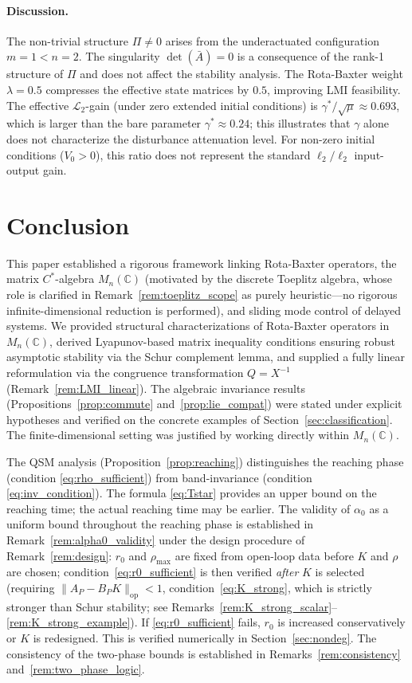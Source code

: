 \documentclass[10pt]{amsart}
\numberwithin{equation}{section}
\begin{document}
\paragraph{Discussion.}
The non-trivial structure $\Pi \neq 0$ arises from the underactuated configuration
$m=1<n=2$. The singularity $\det(\bar{A})=0$ is a consequence of the rank-1 structure
of $\Pi$ and does not affect the stability analysis. The Rota-Baxter weight
$\lambda=0.5$ compresses the effective state matrices by $0.5$, improving LMI
feasibility. The effective $\mathcal{L}_2$-gain (under zero extended initial conditions)
is $\gamma^*/\sqrt{\mu} \approx 0.693$, which is larger than the bare parameter
$\gamma^* \approx 0.24$; this illustrates that $\gamma$ alone does not characterize
the disturbance attenuation level. For non-zero initial conditions ($V_0 > 0$),
this ratio does not represent the standard $\ell_2/\ell_2$ input-output gain.


\section{Conclusion}\label{sec:conclusion}
This paper established a rigorous framework linking Rota-Baxter operators, the matrix
$C^*$-algebra $M_n(\mathbb{C})$ (motivated by the discrete Toeplitz algebra, whose
role is clarified in Remark~\ref{rem:toeplitz_scope} as purely heuristic---no rigorous
infinite-dimensional reduction is performed), and sliding mode control of delayed
systems. We provided structural characterizations of Rota-Baxter operators in
$M_n(\mathbb{C})$, derived Lyapunov-based matrix inequality conditions ensuring robust
asymptotic stability via the Schur complement lemma, and supplied a fully linear
reformulation via the congruence transformation $Q = X^{-1}$
(Remark~\ref{rem:LMI_linear}). The algebraic invariance results
(Propositions~\ref{prop:commute} and~\ref{prop:lie_compat}) were stated under explicit
hypotheses and verified on the concrete examples of Section~\ref{sec:classification}.
The finite-dimensional setting was justified by working directly within $M_n(\mathbb{C})$.

The QSM analysis (Proposition~\ref{prop:reaching}) distinguishes the reaching phase
(condition \eqref{eq:rho_sufficient}) from band-invariance (condition
\eqref{eq:inv_condition}). The formula \eqref{eq:Tstar} provides an upper bound on the
reaching time; the actual reaching time may be earlier. The validity of $\alpha_0$ as a
uniform bound throughout the reaching phase is established in
Remark~\ref{rem:alpha0_validity} under the design procedure of Remark~\ref{rem:design}:
$r_0$ and $\rho_{\max}$ are fixed from open-loop data before $K$ and $\rho$ are chosen;
condition~\eqref{eq:r0_sufficient} is then verified \emph{after} $K$ is selected
(requiring $\|A_P - B_PK\|_{\mathrm{op}} < 1$, condition~\eqref{eq:K_strong}, which is
strictly stronger than Schur stability; see
Remarks~\ref{rem:K_strong_scalar}--\ref{rem:K_strong_example}). If
\eqref{eq:r0_sufficient} fails, $r_0$ is increased conservatively or $K$ is redesigned.
This is verified numerically in Section~\ref{sec:nondeg}. The consistency of the
two-phase bounds is established in Remarks~\ref{rem:consistency} and~\ref{rem:two_phase_logic}.
\end{document}
